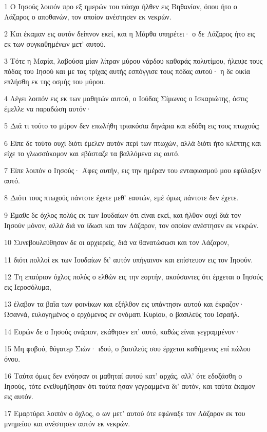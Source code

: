 \par 1 Ο Ιησούς λοιπόν προ εξ ημερών του πάσχα ήλθεν εις Βηθανίαν, όπου ήτο ο Λάζαρος ο αποθανών, τον οποίον ανέστησεν εκ νεκρών.
\par 2 Και έκαμαν εις αυτόν δείπνον εκεί, και η Μάρθα υπηρέτει· ο δε Λάζαρος ήτο εις εκ των συγκαθημένων μετ' αυτού.
\par 3 Τότε η Μαρία, λαβούσα μίαν λίτραν μύρου νάρδου καθαράς πολυτίμου, ήλειψε τους πόδας του Ιησού και με τας τρίχας αυτής εσπόγγισε τους πόδας αυτού· η δε οικία επλήσθη εκ της οσμής του μύρου.
\par 4 Λέγει λοιπόν εις εκ των μαθητών αυτού, ο Ιούδας Σίμωνος ο Ισκαριώτης, όστις έμελλε να παραδώση αυτόν·
\par 5 Διά τι τούτο το μύρον δεν επωλήθη τριακόσια δηνάρια και εδόθη εις τους πτωχούς;
\par 6 Είπε δε τούτο ουχί διότι έμελεν αυτόν περί των πτωχών, αλλά διότι ήτο κλέπτης και είχε το γλωσσόκομον και εβάσταζε τα βαλλόμενα εις αυτό.
\par 7 Είπε λοιπόν ο Ιησούς· Άφες αυτήν, εις την ημέραν του ενταφιασμού μου εφύλαξεν αυτό.
\par 8 Διότι τους πτωχούς πάντοτε έχετε μεθ' εαυτών, εμέ όμως πάντοτε δεν έχετε.
\par 9 Έμαθε δε όχλος πολύς εκ των Ιουδαίων ότι είναι εκεί, και ήλθον ουχί διά τον Ιησούν μόνον, αλλά διά να ίδωσι και τον Λάζαρον, τον οποίον ανέστησεν εκ νεκρών.
\par 10 Συνεβουλεύθησαν δε οι αρχιερείς, διά να θανατώσωσι και τον Λάζαρον,
\par 11 διότι πολλοί εκ των Ιουδαίων δι' αυτόν υπήγαινον και επίστευον εις τον Ιησούν.
\par 12 Τη επαύριον όχλος πολύς ο ελθών εις την εορτήν, ακούσαντες ότι έρχεται ο Ιησούς εις Ιεροσόλυμα,
\par 13 έλαβον τα βαΐα των φοινίκων και εξήλθον εις υπάντησιν αυτού και έκραζον· Ωσαννά, ευλογημένος ο ερχόμενος εν ονόματι Κυρίου, ο βασιλεύς του Ισραήλ.
\par 14 Ευρών δε ο Ιησούς ονάριον, εκάθησεν επ' αυτό, καθώς είναι γεγραμμένον·
\par 15 Μη φοβού, θύγατερ Σιών· ιδού, ο βασιλεύς σου έρχεται καθήμενος επί πώλου όνου.
\par 16 Ταύτα όμως δεν ενόησαν οι μαθηταί αυτού κατ' αρχάς, αλλ' ότε εδοξάσθη ο Ιησούς, τότε ενεθυμήθησαν ότι ταύτα ήσαν γεγραμμένα δι' αυτόν, και ταύτα έκαμον εις αυτόν.
\par 17 Εμαρτύρει λοιπόν ο όχλος, ο ων μετ' αυτού ότε εφώναξε τον Λάζαρον εκ του μνημείου και ανέστησεν αυτόν εκ νεκρών.
